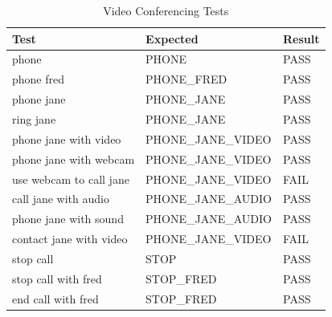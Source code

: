 \documentclass[11pt]{article}
\begin{document}
\begin{appendices}
\begin{table}[H]
\scriptsize
\centering
\caption{Video Conferencing Tests}
\label{table:calling-scores}
\begin{tabular}{lll}
\multicolumn{1}{l|}{Test}                           & \multicolumn{1}{l|}{Expected}           & Result                       \\ \hline
\multicolumn{1}{l|}{phone}                          & \multicolumn{1}{l|}{PHONE}              & \cellcolor[HTML]{67FD9A}PASS \\ \hline
\multicolumn{1}{l|}{phone fred}                     & \multicolumn{1}{l|}{PHONE\_FRED}        & \cellcolor[HTML]{67FD9A}PASS \\ \hline
\multicolumn{1}{l|}{phone jane}                     & \multicolumn{1}{l|}{PHONE\_JANE}        & \cellcolor[HTML]{67FD9A}PASS \\ \hline
\multicolumn{1}{l|}{ring jane}                      & \multicolumn{1}{l|}{PHONE\_JANE}        & \cellcolor[HTML]{67FD9A}PASS \\ \hline
\multicolumn{1}{l|}{phone jane with video}          & \multicolumn{1}{l|}{PHONE\_JANE\_VIDEO} & \cellcolor[HTML]{67FD9A}PASS \\ \hline
\multicolumn{1}{l|}{phone jane with webcam}         & \multicolumn{1}{l|}{PHONE\_JANE\_VIDEO} & \cellcolor[HTML]{67FD9A}PASS \\ \hline
\multicolumn{1}{l|}{use webcam to call jane}        & \multicolumn{1}{l|}{PHONE\_JANE\_VIDEO} & \cellcolor[HTML]{FD6864}FAIL \\ \hline
\multicolumn{1}{l|}{call jane with audio}           & \multicolumn{1}{l|}{PHONE\_JANE\_AUDIO} & \cellcolor[HTML]{67FD9A}PASS \\ \hline
\multicolumn{1}{l|}{phone jane with sound}          & \multicolumn{1}{l|}{PHONE\_JANE\_AUDIO} & \cellcolor[HTML]{67FD9A}PASS \\ \hline
\multicolumn{1}{l|}{contact jane with video}        & \multicolumn{1}{l|}{PHONE\_JANE\_VIDEO} & \cellcolor[HTML]{FD6864}FAIL \\ \hline
\multicolumn{1}{l|}{stop call}                      & \multicolumn{1}{l|}{STOP}               & \cellcolor[HTML]{67FD9A}PASS \\ \hline
\multicolumn{1}{l|}{stop call with fred}            & \multicolumn{1}{l|}{STOP\_FRED}         & \cellcolor[HTML]{67FD9A}PASS \\ \hline
\multicolumn{1}{l|}{end call with fred}             & \multicolumn{1}{l|}{STOP\_FRED}         & \cellcolor[HTML]{67FD9A}PASS \\ \hline

\end{tabular}
\end{table}
\end{appendices}
\end{document}
